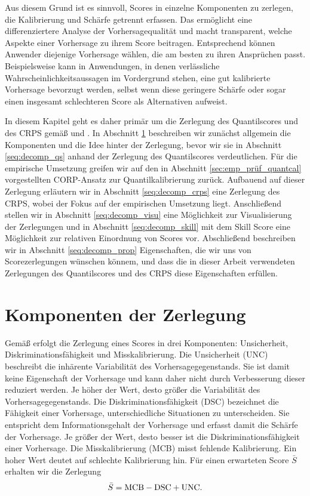 Aus diesem Grund ist es sinnvoll, Scores in einzelne Komponenten zu zerlegen, die Kalibrierung und Schärfe getrennt erfassen. Das ermöglicht eine differenziertere Analyse der Vorhersagequalität und macht transparent, welche Aspekte einer Vorhersage zu ihrem Score beitragen. Entsprechend können Anwender diejenige Vorhersage wählen, die am besten zu ihren Ansprüchen passt. Beispielsweise kann in Anwendungen, in denen verlässliche Wahrscheinlichkeitsaussagen im Vordergrund stehen, eine gut kalibrierte Vorhersage bevorzugt werden, selbst wenn diese geringere Schärfe oder sogar einen insgesamt schlechteren Score als Alternativen aufweist.

In diesem Kapitel geht es daher primär um die Zerlegung des Quantilscores und des CRPS gemäß \textcite{gneiting2023regression} und \textcite{arnold2024decompositions}. In Abschnitt \ref{seq:score_components} beschreiben wir zunächst allgemein die Komponenten und die Idee hinter der Zerlegung, bevor wir sie in Abschnitt \ref{seq:decomp_qs} anhand der Zerlegung des Quantilscores verdeutlichen.  Für die empirische Umsetzung greifen wir auf den in Abschnitt \ref{sec:emp_prüf_quantcal} vorgestellten CORP-Ansatz zur Quantilkalibrierung zurück. Aufbauend auf dieser Zerlegung erläutern wir in Abschnitt \ref{seq:decomp_crps} eine Zerlegung des CRPS, wobei der Fokus auf der empirischen Umsetzung liegt. Anschließend stellen wir in Abschnitt \ref{seq:decomp_visu} eine Möglichkeit zur Visualisierung der Zerlegungen und in Abschnitt \ref{seq:decomp_skill} mit dem Skill Score eine Möglichkeit zur relativen Einordnung von Scores vor. Abschließend beschreiben wir in Abschnitt \ref{seq:decomp_prop} Eigenschaften, die wir uns von Scorezerlegungen wünschen könnem, und dass die in dieser Arbeit verwendeten Zerlegungen des Quantilscores und des CRPS diese Eigenschaften erfüllen.

\section{Komponenten der Zerlegung} \label{seq:score_components}
Gemäß \textcite{gneiting2023regression} erfolgt die Zerlegung eines Scores in drei Komponenten: Unsicherheit, Diskriminationsfähigkeit und Misskalibrierung. Die Unsicherheit (UNC) beschreibt die inhärente Variabilität des Vorhersagegegenstands. Sie ist damit keine Eigenschaft der Vorhersage und kann daher nicht durch Verbesserung dieser reduziert werden. Je höher der Wert, desto größer die Variabilität des Vorhersagegegenstands. Die Diskriminationsfähigkeit (DSC) bezeichnet die Fähigkeit einer Vorhersage, unterschiedliche Situationen zu unterscheiden. Sie entspricht dem Informationsgehalt der Vorhersage und erfasst damit die Schärfe der Vorhersage. Je größer der Wert, desto besser ist die Diskriminationsfähigkeit einer Vorhersage. Die Misskalibrierung (MCB) misst fehlende Kalibrierung. Ein hoher Wert deutet auf schlechte Kalibrierung hin. Für einen erwarteten Score $\bar S$ erhalten wir die Zerlegung
\[
\bar S = \mathrm{MCB} - \mathrm{DSC} + \mathrm{UNC}.
\]

